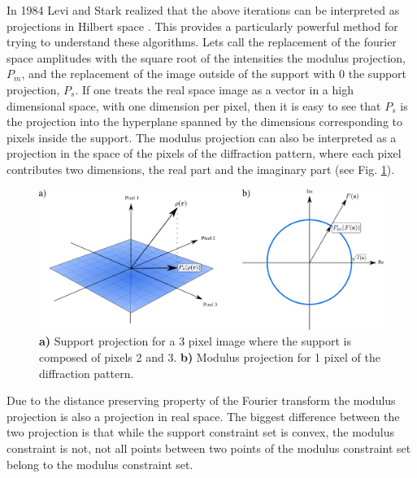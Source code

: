 In 1984 Levi and Stark realized that the above iterations can be
interpreted as projections in Hilbert space \cite{Levi84}. This provides a
particularly powerful method for trying to understand these algorithms.
Lets call the replacement of the fourier space amplitudes with the square root of
the intensities the modulus projection, $P_m$, and the replacement of the image
outside of the support with 0 the support projection, $P_s$. If one treats the
real space image as a vector in a high dimensional space, with one dimension per
pixel, then it is easy to see that $P_s$ is the projection into the hyperplane
spanned by the dimensions corresponding to pixels inside the support. The
modulus projection can also be interpreted as a projection in the space of the
pixels of the diffraction pattern, where each pixel contributes two dimensions,
the real part and the imaginary part (see Fig. \ref{Fig:Projections}). 

\begin{figure}[h]
  \centering
  \includegraphics[width=1 \columnwidth]{Image_Reconstruction/projections.png}
  \caption{{\bf a)} Support projection for a 3 pixel image where the support is
    composed of pixels 2 and 3. {\bf b)} Modulus projection for 1 pixel of the
    diffraction pattern.}
  \label{Fig:Projections}
\end{figure}

Due to the distance preserving property of the Fourier transform the modulus
projection is also a projection in real space. The biggest difference between
the two projection is that while the support constraint set is convex, the
modulus constraint is not, not all points between two points of the modulus
constraint set belong to the modulus constraint set.
